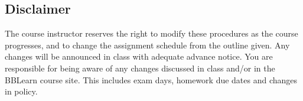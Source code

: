 \documentclass[12pt]{article}
\begin{document}
\subsection{Disclaimer}
The course instructor reserves the right to modify these procedures as the course progresses, and to change the assignment schedule from the outline given. Any changes will 
be announced in class with adequate advance notice. You are responsible for being aware of any changes 
discussed in class and/or in the BBLearn course site. This includes exam days, homework due dates and changes 
in policy.

%
\end{document}
